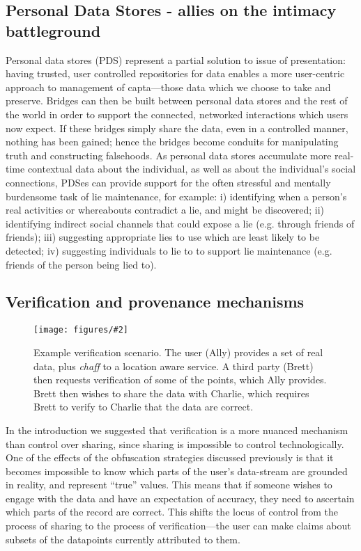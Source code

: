 \documentclass{IOS-Book-Article}     %
\newcommand{\fig}[3][0.9]{
\begin{figure}[tp]
\begin{center}
\texttt{[image: figures/\#2]}
\caption{#3}
\label{fig:#2}
\end{center}
\end{figure}
}
\newcommand{\tbox}[3][red]{{
\color{#1}\noindent{
   \fbox{\scriptsize{ {\bf #2} \textsl{#3}}}
   \vspace{2pt}
}
}}
\newcommand{\todo}[1]{\tbox{TODO:}{#1}}
\begin{document}


\subsection{Personal Data Stores - allies on the intimacy battleground}

Personal data stores (PDS) represent a partial solution to issue of
presentation: having trusted, user controlled repositories for data enables a
more user-centric approach to management of capta---those data which we choose
to take and preserve. Bridges can then be built between personal data stores and
the rest of the world in order to support the connected, networked interactions
which users now expect. If these bridges simply share the data, even in a
controlled manner, nothing has been gained; hence the bridges become conduits
for manipulating truth and constructing falsehoods. As personal data stores
accumulate more real-time contextual data about the individual, as well as about
the individual's social connections, PDSes can provide support for the often
stressful and mentally burdensome task of lie maintenance, for example: i)
identifying when a person's real activities or whereabouts contradict a lie, and
might be discovered; ii) identifying indirect social channels that could expose
a lie (e.g. through friends of friends); iii) suggesting appropriate lies to use
which are least likely to be detected; iv) suggesting individuals to lie to to
support lie maintenance (e.g. friends of the person being lied to).


\subsection{Verification and provenance mechanisms}

\fig{Verification}{Example verification scenario. The user (Ally) provides a set
of real data, plus \emph{chaff} to a location aware service. A third party
(Brett) then requests verification of some of the points, which Ally
provides. Brett then wishes to share the data with Charlie, which requires Brett
to verify to Charlie that the data are correct.}

In the introduction we suggested that verification is a more nuanced mechanism
than control over sharing, since sharing is impossible to control
technologically. One of the effects of the obfuscation strategies discussed
previously is that it becomes impossible to know which parts of the user's
data-stream are grounded in reality, and represent ``true'' values. This means
that if someone wishes to engage with the data and have an expectation of
accuracy, they need to ascertain which parts of the record are correct. This
shifts the locus of control from the process of sharing to the process of
verification---the user can make claims about subsets of the datapoints
currently attributed to them.
\end{document}
